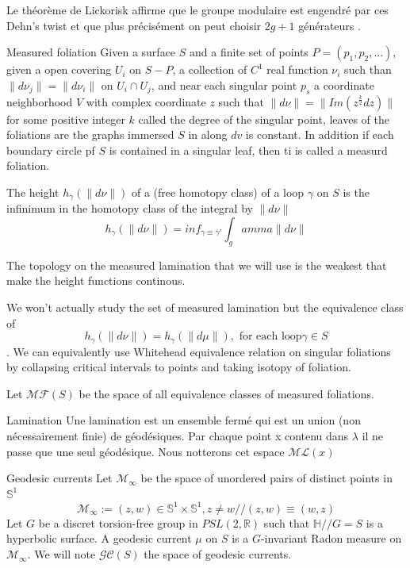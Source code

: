 \begin{rmq}
Le théorème de Lickorisk affirme que le groupe modulaire est engendré par ces Dehn's twist et que plus précisément on peut choisir $2g+1$ générateurs \cite{Lickorish1964AFS}.
\end{rmq}

\begin{dfnt}{Measured foliation}
Given a surface $S$ and a finite set of points $P=(p_1,p_2,...)$, given a open covering $U_i$ on $S-P$, a collection of $C^1$
 real function $\nu_i$ such than $\| d \nu_j \| = \| d \nu_i \|$  on $U_i \cap U_j$,
 and near each singular point $p_s$ a coordinate neighborhood $V$ with complex coordinate $z$ such that $\| d \nu \| = \| Im(z^{\frac{k}{2}}dz) \|$ for some positive integer $k$ called the degree of the singular point,
 leaves of the foliations are the graphs immersed $S$ in along $dv$ is constant. In addition if each boundary circle pf $S$ is contained in a singular leaf, then ti is called a measurd foliation.
\end{dfnt}

The height $h_\gamma(\| d \nu \|)$ of a (free homotopy class) of a loop $\gamma$ on $S$ is the infinimum in the homotopy class of the integral by $\| d \nu \|$
\[
h_\gamma(\| d \nu \|)=inf_{\gamma \equiv \gamma'} \int_gamma \| d \nu \|
\]

The topology on the measured lamination that we will use is the weakest that make the height functions continous.

\begin{rmq}
We won't actually study the set of measured lamination but the equivalence class of \[
h_\gamma(\| d \nu \|)=h_\gamma(\| d \mu \|), \text{ for each loop} \gamma \in S
\].
We can equivalently use Whitehead equivalence relation on singular foliations by collapsing critical intervals to points and taking isotopy of foliation.
\end{rmq}

Let $\mathcal{MF}(S)$ be the space of all equivalence classes of measured foliations.
\begin{dfnt}{Lamination}
Une lamination est un ensemble fermé qui est un union (non nécessairement finie) de géodésiques.
Par chaque point x contenu dans $\lambda$ il ne passe que une seul géodésique.
Nous notterons cet espace $\mathcal{ML}(x)$
\end{dfnt}

\begin{dfnt}{Geodesic currents}
Let $\mathcal{M}_\infty$ be the space of unordered pairs of distinct points in $\mathbb{S}^1$ \[
\mathcal{M}_\infty := {(z,w) \in \mathbb{S}^1 \times \mathbb{S}^1 , z \neq w}//(z,w) \equiv (w,z)
\]
Let $G$ be a discret torsion-free group in $PSL(2,\mathbb{R})$ such that $\mathbb{H}//G=S$ is a hyperbolic surface.
A geodesic current $\mu$ on $S$ is a $G$-invariant Radon measure on $\mathcal{M}_\infty$.
We will note $\mathcal{GC}(S)$ the space of geodesic currents.
\end{dfnt}

